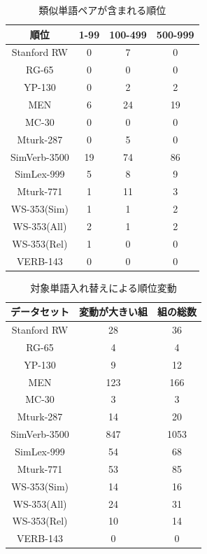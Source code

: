 \documentclass[twocolumn]{jarticle}     %
\begin{document}
\begin{table}[th]
  \caption{類似単語ペアが含まれる順位}
  \label{tb:result}
  \begin{tabular}{c|ccc}
    \hline
    順位           & 1-99 & 100-499 & 500-999 \\ \hline
    Stanford RW  & 0    & 7       & 0       \\
    RG-65        & 0    & 0       & 0       \\
    YP-130       & 0    & 2       & 2       \\
    MEN          & 6    & 24      & 19      \\
    MC-30        & 0    & 0       & 0       \\
    Mturk-287    & 0    & 5       & 0       \\
    SimVerb-3500 & 19   & 74      & 86      \\
    SimLex-999   & 5    & 8       & 9       \\
    Mturk-771    & 1    & 11      & 3       \\
    WS-353(Sim)  & 1    & 1       & 2       \\
    WS-353(All)  & 2    & 1       & 2       \\
    WS-353(Rel)  & 1    & 0       & 0       \\
    VERB-143     & 0    & 0       & 0       \\ \hline
  \end{tabular}
\end{table}

\begin{table}[th]
  \centering
  \caption{対象単語入れ替えによる順位変動}
  \label{tb:rankdiff}
  \begin{tabular}{c|c|c}
    \hline
    データセット       & 変動が大きい組 & 組の総数 \\ \hline
    Stanford RW  & 28      & 36   \\
    RG-65        & 4       & 4    \\
    YP-130       & 9       & 12   \\
    MEN          & 123     & 166  \\
    MC-30        & 3       & 3    \\
    Mturk-287    & 14      & 20   \\
    SimVerb-3500 & 847     & 1053 \\
    SimLex-999   & 54      & 68   \\
    Mturk-771    & 53      & 85   \\
    WS-353(Sim)  & 14      & 16   \\
    WS-353(All)  & 24      & 31   \\
    WS-353(Rel)  & 10      & 14   \\
    VERB-143     & 0       & 0    \\ \hline
  \end{tabular}
\end{table}
\end{document}
